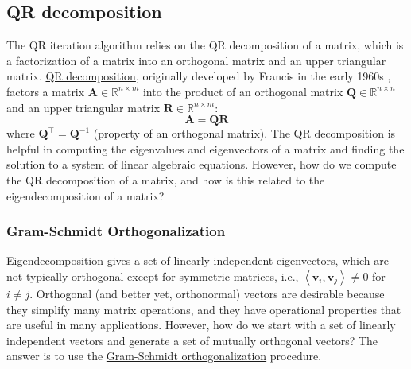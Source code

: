 \documentclass{article}[11pt]
\begin{document}
\subsection{QR decomposition}
The QR iteration algorithm relies on the QR decomposition of a matrix, which is a factorization of a matrix into an orthogonal matrix and an upper triangular matrix.
\href{https://en.wikipedia.org/wiki/QR_decomposition}{QR decomposition}, originally developed by Francis in the early 1960s \cite{Francis-QR-1961, Francis-QR-1962}, factors a matrix $\mathbf{A}\in\mathbb{R}^{n\times{m}}$ 
into the product of an orthogonal matrix $\mathbf{Q}\in\mathbb{R}^{n\times{n}}$ and 
an upper triangular matrix $\mathbf{R}\in\mathbb{R}^{n\times{m}}$:
\begin{equation}
\mathbf{A} = \mathbf{Q}\mathbf{R}
\end{equation}
where $\mathbf{Q}^{\top} = \mathbf{Q}^{-1}$ (property of an orthogonal matrix). 
The QR decomposition is helpful in computing the eigenvalues and eigenvectors of a matrix and finding the solution to a system of linear algebraic equations.
However, how do we compute the QR decomposition of a matrix, and how is this related to the eigendecomposition of a matrix?

\subsubsection*{Gram-Schmidt Orthogonalization}
Eigendecomposition gives a set of linearly independent eigenvectors, which are not typically orthogonal except for symmetric matrices, i.e., $\left<\mathbf{v}_{i},\mathbf{v}_{j}\right>\neq{0}$ for $i\neq{j}$.
Orthogonal (and better yet, orthonormal) vectors are desirable because they simplify many matrix operations, 
and they have operational properties that are useful in many applications. 
However, how do we start with a set of linearly independent vectors and generate a set of mutually orthogonal vectors?
The answer is to use the \href{https://en.wikipedia.org/wiki/Gram-Schmidt_process}{Gram-Schmidt orthogonalization} procedure. 
\end{document}
